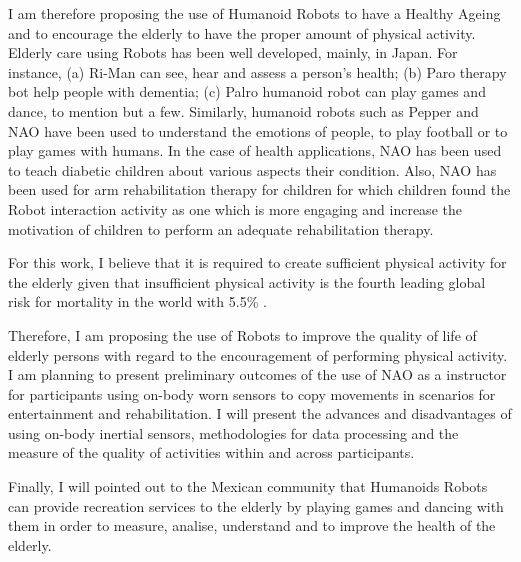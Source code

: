 \documentclass[12pt,journal,onecolumn,compsoc]{IEEEtran}
\begin{document}
I am therefore proposing the use of Humanoid Robots to have a Healthy Ageing and to encourage the elderly
to have the proper amount of physical activity. 
Elderly care using Robots has been well developed, mainly, in Japan. For instance,
(a) Ri-Man can see, hear and assess a person's health; (b) Paro therapy bot help people with dementia; 
(c) Palro humanoid robot can play games and dance, to mention but a few.
Similarly, humanoid robots such as Pepper and NAO have been used to understand the emotions of people,
to play football or to play games with humans. In the case of health applications, 
NAO has been used to teach diabetic children about various aspects their condition.
Also, NAO has been used for arm rehabilitation therapy for children for which children found the Robot 
interaction activity as one which is more engaging 
and increase the motivation of children to perform an adequate rehabilitation therapy.


For this work, I believe that it is required to create sufficient physical activity for the elderly
given that insufficient physical activity is the fourth leading global risk for mortality in the world with 5.5\%  
\cite{GHR09}. 

Therefore, I am proposing the use of Robots to improve the quality of life of elderly persons
with regard to the encouragement of performing physical activity.
I am planning to present preliminary outcomes of the use of NAO as a instructor
for participants using on-body worn sensors 
to copy movements in scenarios for entertainment and rehabilitation.
I will present the advances and disadvantages of using on-body inertial sensors,
methodologies for data processing and the measure of the quality of activities 
within and across participants.


Finally, I will pointed out to the Mexican community that 
Humanoids Robots can provide recreation services to the elderly by playing games and dancing with them
in order to measure, analise, understand and to improve the health of the elderly.


\end{document}
